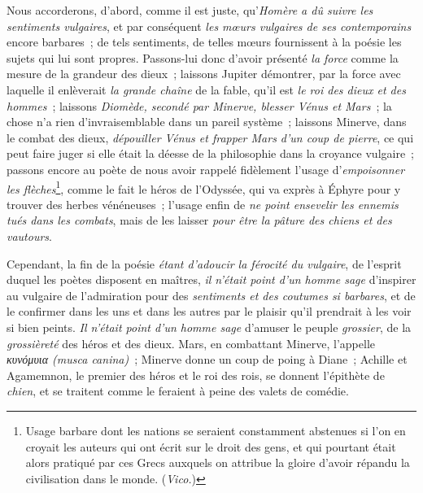 \documentclass[french,twoside]{book} %
\newcommand\chaptercont{} %
\begin{document}
\chaptercont
\noindent  Nous accorderons, d’abord, comme il est juste, qu’{\itshape Homère a dû suivre les sentiments vulgaires}, et par conséquent {\itshape les mœurs vulgaires de ses contemporains} encore barbares ; de tels sentiments, de telles mœurs fournissent à la poésie les sujets qui lui sont propres. Passons-lui donc d’avoir présenté {\itshape la force} comme la mesure de la grandeur des dieux ; laissons Jupiter démontrer, par la force avec laquelle il enlèverait {\itshape la grande chaîne} de la fable, qu’il est {\itshape le roi des dieux et des hommes} ; laissons {\itshape Diomède, secondé par Minerve, blesser Vénus et Mars} ; la chose n’a rien d’invraisemblable dans un pareil système ; laissons Minerve, dans le combat des dieux, {\itshape dépouiller Vénus et frapper Mars d’un coup de pierre}, ce qui peut faire juger si elle était la déesse de la philosophie dans la croyance vulgaire ; passons encore au poète de nous avoir rappelé fidèlement l’usage d’{\itshape empoisonner les flèches}\footnote{Usage barbare dont les nations se seraient constamment abstenues si l’on en croyait les auteurs qui ont écrit sur le droit des gens, et qui pourtant était alors pratiqué par ces Grecs auxquels on attribue la gloire d’avoir répandu la civilisation dans le monde. ({\itshape Vico.})}, comme  le fait le héros de l’Odyssée, qui va exprès à Éphyre pour y trouver des herbes vénéneuses ; l’usage enfin de {\itshape ne point ensevelir les ennemis tués dans les combats}, mais de les laisser {\itshape pour être la pâture des chiens et des vautours}.\par
Cependant, la fin de la poésie {\itshape étant d’adoucir la férocité du vulgaire}, de l’esprit duquel les poètes disposent en maîtres, {\itshape il n’était point d’un homme sage} d’inspirer au vulgaire de l’admiration pour des {\itshape sentiments et des coutumes si barbares}, et de le confirmer dans les uns et dans les autres par le plaisir qu’il prendrait à les voir si bien peints. {\itshape Il n’était point d’un homme sage} d’amuser le peuple {\itshape grossier}, de la {\itshape grossièreté} des héros et des dieux. Mars, en combattant Minerve, l’appelle \emph{κυνόμυια ({\itshape musca canina})} ; Minerve donne un coup de poing à Diane ; Achille et Agamemnon, le premier des héros et le roi des rois, se donnent l’épithète de {\itshape chien}, et se traitent comme le feraient à peine des valets de comédie.\par
\end{document}
